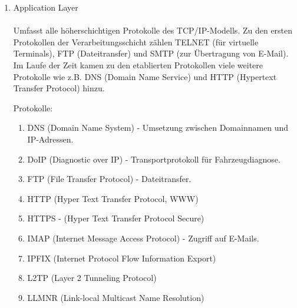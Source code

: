 \documentclass[11pt]{article}
\begin{document}
    \begin{enumerate}

        \item{Application Layer}\\\\
        Umfasst alle höherschichtigen Protokolle des TCP/IP-Modells.
        Zu den ersten Protokollen der Verarbeitungsschicht zählen TELNET (für virtuelle Terminals),
        FTP (Dateitransfer) und SMTP (zur Übertragung von E-Mail).
        Im Laufe der Zeit kamen zu den etablierten Protokollen viele weitere Protokolle wie z.B.
        DNS (Domain Name Service) und HTTP (Hypertext Transfer Protocol) hinzu.\\

        \begin{addmargin}[1em]{1em}

            Protokolle:
            \begin{enumerate}

                \item DNS (Domain Name System) - Umsetzung zwischen Domainnamen und IP-Adressen.\\

                \item DoIP (Diagnostic over IP) - Transportprotokoll für Fahrzeugdiagnose.\\

                \item FTP (File Transfer Protocol) - Dateitransfer.\\

                \item HTTP (Hyper Text Transfer Protocol, WWW)\\

                \item HTTPS - (Hyper Text Transfer Protocol Secure)\\

                \item IMAP (Internet Message Access Protocol) - Zugriff auf E-Mails.\\

                \item IPFIX (Internet Protocol Flow Information Export)\\

                \item L2TP (Layer 2 Tunneling Protocol)\\

                \item LLMNR (Link-local Multicast Name Resolution)\\


\end{enumerate}
\end{addmargin}
\end{enumerate}
\end{document}
